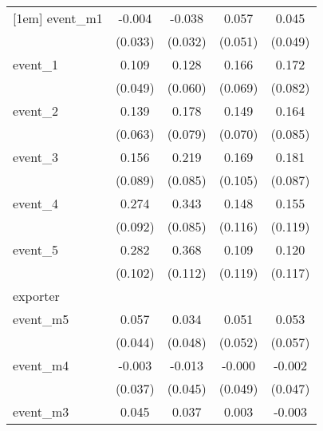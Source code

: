 {\begin{tabular}{l*{4}{c}}
[1em]
event\_m1    &      -0.004         &      -0.038         &       0.057         &       0.045         \\
            &     (0.033)         &     (0.032)         &     (0.051)         &     (0.049)         \\
[1em]
event\_1     &       0.109\sym{*}  &       0.128\sym{*}  &       0.166\sym{*}  &       0.172\sym{*}  \\
            &     (0.049)         &     (0.060)         &     (0.069)         &     (0.082)         \\
[1em]
event\_2     &       0.139\sym{*}  &       0.178\sym{*}  &       0.149\sym{*}  &       0.164         \\
            &     (0.063)         &     (0.079)         &     (0.070)         &     (0.085)         \\
[1em]
event\_3     &       0.156         &       0.219\sym{*}  &       0.169         &       0.181\sym{*}  \\
            &     (0.089)         &     (0.085)         &     (0.105)         &     (0.087)         \\
[1em]
event\_4     &       0.274\sym{**} &       0.343\sym{***}&       0.148         &       0.155         \\
            &     (0.092)         &     (0.085)         &     (0.116)         &     (0.119)         \\
[1em]
event\_5     &       0.282\sym{**} &       0.368\sym{**} &       0.109         &       0.120         \\
            &     (0.102)         &     (0.112)         &     (0.119)         &     (0.117)         \\
\hline
exporter    &                     &                     &                     &                     \\
event\_m5    &       0.057         &       0.034         &       0.051         &       0.053         \\
            &     (0.044)         &     (0.048)         &     (0.052)         &     (0.057)         \\
[1em]
event\_m4    &      -0.003         &      -0.013         &      -0.000         &      -0.002         \\
            &     (0.037)         &     (0.045)         &     (0.049)         &     (0.047)         \\
[1em]
event\_m3    &       0.045         &       0.037         &       0.003         &      -0.003         \\

\end{tabular}}
